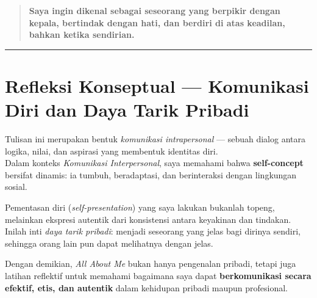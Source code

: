 \documentclass[
  letterpaper,
  DIV=11,
  numbers=noendperiod]{scrreprt}
\begin{document}
\begin{quote}
\textbf{Saya ingin dikenal sebagai seseorang yang berpikir dengan
kepala, bertindak dengan hati, dan berdiri di atas keadilan, bahkan
ketika sendirian.}
\end{quote}

\begin{center}\rule{0.5\linewidth}{0.5pt}\end{center}

\section{\texorpdfstring{\textbf{Refleksi Konseptual --- Komunikasi Diri
dan Daya Tarik
Pribadi}}{Refleksi Konseptual --- Komunikasi Diri dan Daya Tarik Pribadi}}\label{refleksi-konseptual-komunikasi-diri-dan-daya-tarik-pribadi}

Tulisan ini merupakan bentuk \emph{komunikasi intrapersonal} --- sebuah
dialog antara logika, nilai, dan aspirasi yang membentuk identitas
diri.\\
Dalam konteks \emph{Komunikasi Interpersonal}, saya memahami bahwa
\textbf{self-concept} bersifat dinamis: ia tumbuh, beradaptasi, dan
berinteraksi dengan lingkungan sosial.

Pementasan diri (\emph{self-presentation}) yang saya lakukan bukanlah
topeng, melainkan ekspresi autentik dari konsistensi antara keyakinan
dan tindakan.\\
Inilah inti \emph{daya tarik pribadi}: menjadi seseorang yang jelas bagi
dirinya sendiri, sehingga orang lain pun dapat melihatnya dengan jelas.

Dengan demikian, \emph{All About Me} bukan hanya pengenalan pribadi,
tetapi juga latihan reflektif untuk memahami bagaimana saya dapat
\textbf{berkomunikasi secara efektif, etis, dan autentik} dalam
kehidupan pribadi maupun profesional.
\end{document}

